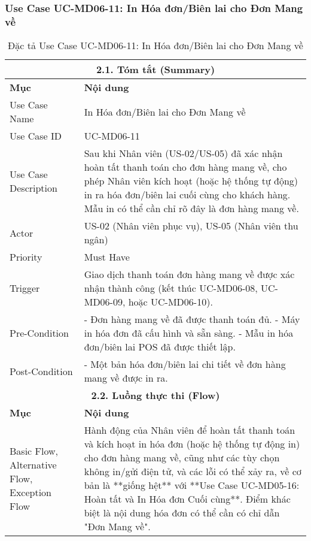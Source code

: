 \subsubsection{Use Case UC-MD06-11: In Hóa đơn/Biên lai cho Đơn Mang về}
\begin{longtable}{|m{4cm}|p{11cm}|}
\caption{Đặc tả Use Case UC-MD06-11: In Hóa đơn/Biên lai cho Đơn Mang về} \label{tab:uc_md06_11_final_v3} \\
\hline
\multicolumn{2}{|c|}{\textbf{2.1. Tóm tắt (Summary)}} \\
\hline
\textbf{Mục} & \textbf{Nội dung} \\
\hline
\endhead %
\hline
\endfoot %
\hline
\endlastfoot %
Use Case Name & In Hóa đơn/Biên lai cho Đơn Mang về \\
\hline
Use Case ID & UC-MD06-11 \\
\hline
Use Case Description & Sau khi Nhân viên (US-02/US-05) đã xác nhận hoàn tất thanh toán cho đơn hàng mang về, cho phép Nhân viên kích hoạt (hoặc hệ thống tự động) in ra hóa đơn/biên lai cuối cùng cho khách hàng. Mẫu in có thể cần chỉ rõ đây là đơn hàng mang về. \\
\hline
Actor & US-02 (Nhân viên phục vụ), US-05 (Nhân viên thu ngân) \\
\hline
Priority & Must Have \\
\hline
Trigger & Giao dịch thanh toán đơn hàng mang về được xác nhận thành công (kết thúc UC-MD06-08, UC-MD06-09, hoặc UC-MD06-10). \\
\hline
Pre-Condition & - Đơn hàng mang về đã được thanh toán đủ. \newline - Máy in hóa đơn đã cấu hình và sẵn sàng. \newline - Mẫu in hóa đơn/biên lai POS đã được thiết lập. \\
\hline
Post-Condition & - Một bản hóa đơn/biên lai chi tiết về đơn hàng mang về được in ra. \\
\hline
\multicolumn{2}{|c|}{\textbf{2.2. Luồng thực thi (Flow)}} \\
\hline
\textbf{Mục} & \textbf{Nội dung} \\
\hline
Basic Flow, Alternative Flow, Exception Flow & Hành động của Nhân viên để hoàn tất thanh toán và kích hoạt in hóa đơn (hoặc hệ thống tự động in) cho đơn hàng mang về, cũng như các tùy chọn không in/gửi điện tử, và các lỗi có thể xảy ra, về cơ bản là **giống hệt** với **Use Case UC-MD05-16: Hoàn tất và In Hóa đơn Cuối cùng**. \newline Điểm khác biệt là nội dung hóa đơn có thể cần có chỉ dẫn "Đơn Mang về". \\

\end{longtable}
